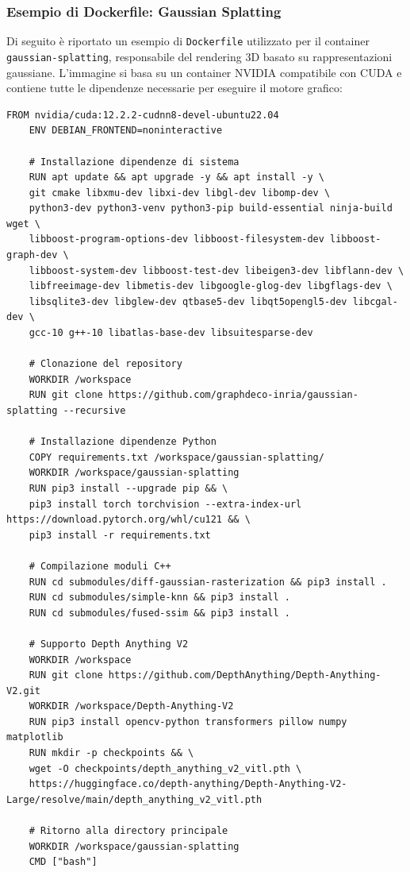 \subsubsection{Esempio di Dockerfile: Gaussian Splatting}
Di seguito è riportato un esempio di \texttt{Dockerfile} utilizzato per il container \texttt{gaussian-splatting}, responsabile del rendering 3D basato su rappresentazioni gaussiane. L'immagine si basa su un container NVIDIA compatibile con CUDA e contiene tutte le dipendenze necessarie per eseguire il motore grafico:

\begin{lstlisting}[language=docker, caption={Dockerfile per gaussian-splatting}, label={lst:dockerfile_gs}]
	FROM nvidia/cuda:12.2.2-cudnn8-devel-ubuntu22.04
	ENV DEBIAN_FRONTEND=noninteractive
	
	# Installazione dipendenze di sistema
	RUN apt update && apt upgrade -y && apt install -y \
	git cmake libxmu-dev libxi-dev libgl-dev libomp-dev \
	python3-dev python3-venv python3-pip build-essential ninja-build wget \
	libboost-program-options-dev libboost-filesystem-dev libboost-graph-dev \
	libboost-system-dev libboost-test-dev libeigen3-dev libflann-dev \
	libfreeimage-dev libmetis-dev libgoogle-glog-dev libgflags-dev \
	libsqlite3-dev libglew-dev qtbase5-dev libqt5opengl5-dev libcgal-dev \
	gcc-10 g++-10 libatlas-base-dev libsuitesparse-dev
	
	# Clonazione del repository
	WORKDIR /workspace
	RUN git clone https://github.com/graphdeco-inria/gaussian-splatting --recursive
	
	# Installazione dipendenze Python
	COPY requirements.txt /workspace/gaussian-splatting/
	WORKDIR /workspace/gaussian-splatting
	RUN pip3 install --upgrade pip && \
	pip3 install torch torchvision --extra-index-url https://download.pytorch.org/whl/cu121 && \
	pip3 install -r requirements.txt
	
	# Compilazione moduli C++
	RUN cd submodules/diff-gaussian-rasterization && pip3 install .
	RUN cd submodules/simple-knn && pip3 install .
	RUN cd submodules/fused-ssim && pip3 install .
	
	# Supporto Depth Anything V2
	WORKDIR /workspace
	RUN git clone https://github.com/DepthAnything/Depth-Anything-V2.git
	WORKDIR /workspace/Depth-Anything-V2
	RUN pip3 install opencv-python transformers pillow numpy matplotlib
	RUN mkdir -p checkpoints && \
	wget -O checkpoints/depth_anything_v2_vitl.pth \
	https://huggingface.co/depth-anything/Depth-Anything-V2-Large/resolve/main/depth_anything_v2_vitl.pth
	
	# Ritorno alla directory principale
	WORKDIR /workspace/gaussian-splatting
	CMD ["bash"]
\end{lstlisting}

